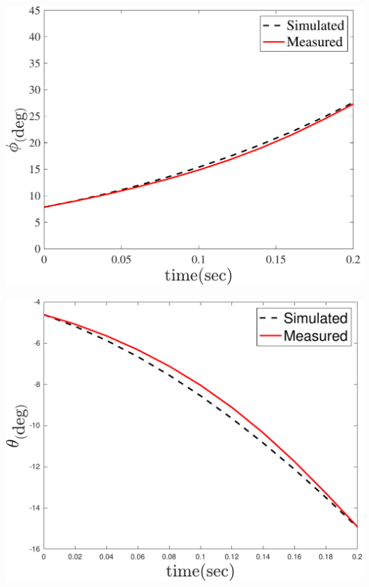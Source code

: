 \documentclass[3p,times]{elsarticle}
\begin{document}
\begin{minipage}[t]{0.95\linewidth}
	\hfill
    \begin{minipage}[b]{0.48\linewidth}
		\centering
		\includegraphics[width=1\linewidth]{../Figure/parameter_estimation/roll-pitch/roll}
		\captionsetup{justification=centering}
	\end{minipage}
    \begin{minipage}[b]{0.48\linewidth}
		\centering
		\includegraphics[width=1\linewidth]{../Figure/parameter_estimation/roll-pitch/pitch}
		\captionsetup{justification=centering}

\end{minipage}
\end{minipage}
\end{document}
